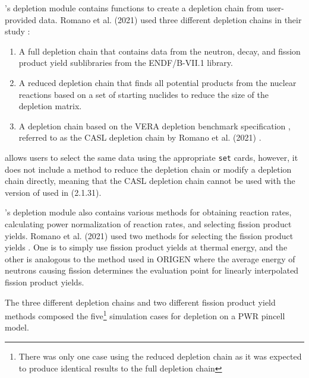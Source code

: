 \OpenMC's depletion module contains functions to create a depletion chain from
user-provided data. Romano et al. (2021) used three different depletion chains
in their study \cite{romano_depletion_2021}:
\begin{enumerate}
    \item A full depletion chain that contains data from the neutron, decay,
        and fission product yield sublibraries from the ENDF/B-VII.1 library.
    \item A reduced depletion chain that finds all potential products from the
        nuclear reactions based on a set of starting nuclides to reduce the
        size of the depletion matrix.
    \item A depletion chain based on the VERA depletion benchmark
        specification \cite{kim_specification_2015}, referred to as the CASL
        depletion chain by Romano et al. (2021) \cite{romano_depletion_2021}.
\end{enumerate}
\SerpentTWO allows users to select the same data using the appropriate \verb,set,
cards, however, it does not include a method to reduce the depletion chain or
modify a depletion chain directly, meaning that the CASL depletion chain cannot
be used with the version of \SerpentTWO used in \cite{romano_depletion_2021}
(2.1.31).

\OpenMC's depletion module also contains various methods for obtaining reaction
rates, calculating power normalization of reaction rates, and selecting fission
product yields. Romano et al. (2021) used two methods  for selecting the fission
product yields \cite{romano_depletion_2021}. One is to simply use fission product
yields at thermal energy, and the other is analogous to the method used in
ORIGEN \cite{gauld_isotopic_2011} where the average energy of neutrons causing
fission determines the evaluation point for linearly interpolated fission
product yields.

The three different depletion chains and two different fission product yield
methods composed the five\footnote{There was only one case using the reduced
depletion chain as it was expected to produce identical results to the full
depletion chain} simulation cases for depletion on a PWR pincell model.

